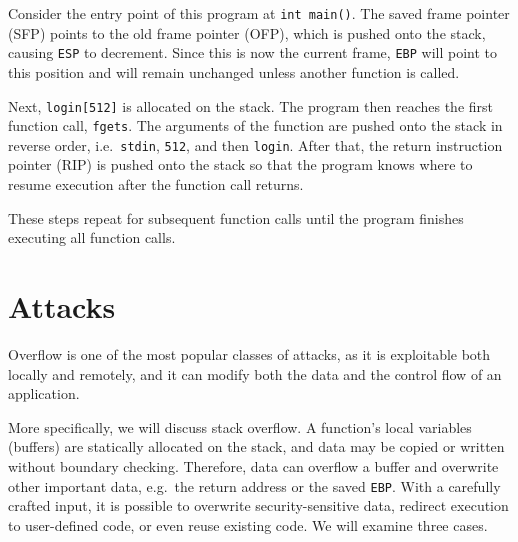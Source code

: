 Consider the entry point of this program at \texttt{int main()}. The saved frame pointer (SFP) points to the old frame pointer (OFP), which is pushed onto the stack, causing \texttt{ESP} to decrement. Since this is now the current frame, \texttt{EBP} will point to this position and will remain unchanged unless another function is called.

Next, \texttt{login[512]} is allocated on the stack. The program then reaches the first function call, \texttt{fgets}. The arguments of the function are pushed onto the stack in reverse order, i.e.\ \texttt{stdin}, \texttt{512}, and then \texttt{login}. After that, the return instruction pointer (RIP) is pushed onto the stack so that the program knows where to resume execution after the function call returns.

These steps repeat for subsequent function calls until the program finishes executing all function calls.

\section{Attacks}
Overflow is one of the most popular classes of attacks, as it is exploitable both locally and remotely, and it can modify both the data and the control flow of an application.

More specifically, we will discuss stack overflow. A function's local variables (buffers) are statically allocated on the stack, and data may be copied or written without boundary checking. Therefore, data can overflow a buffer and overwrite other important data, e.g.\ the return address or the saved \texttt{EBP}. With a carefully crafted input, it is possible to overwrite security-sensitive data, redirect execution to user-defined code, or even reuse existing code. We will examine three cases.


